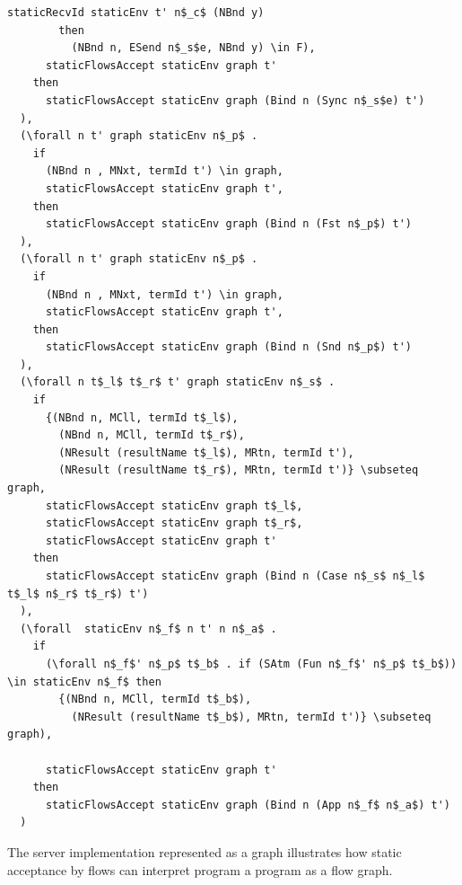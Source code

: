 \documentclass[10pt]{article}
\begin{document}
\begin{lstlisting}[language=logic, mathescape]
          staticRecvId staticEnv t' n$_c$ (NBnd y)
        then
          (NBnd n, ESend n$_s$e, NBnd y) \in F),
      staticFlowsAccept staticEnv graph t'
    then
      staticFlowsAccept staticEnv graph (Bind n (Sync n$_s$e) t')
  ),
  (\forall n t' graph staticEnv n$_p$ .
    if
      (NBnd n , MNxt, termId t') \in graph,
      staticFlowsAccept staticEnv graph t',
    then
      staticFlowsAccept staticEnv graph (Bind n (Fst n$_p$) t')
  ),
  (\forall n t' graph staticEnv n$_p$ .
    if
      (NBnd n , MNxt, termId t') \in graph,
      staticFlowsAccept staticEnv graph t',
    then
      staticFlowsAccept staticEnv graph (Bind n (Snd n$_p$) t')
  ),
  (\forall n t$_l$ t$_r$ t' graph staticEnv n$_s$ .
    if
      {(NBnd n, MCll, termId t$_l$),
        (NBnd n, MCll, termId t$_r$),
        (NResult (resultName t$_l$), MRtn, termId t'),
        (NResult (resultName t$_r$), MRtn, termId t')} \subseteq graph,
      staticFlowsAccept staticEnv graph t$_l$,
      staticFlowsAccept staticEnv graph t$_r$,
      staticFlowsAccept staticEnv graph t'
    then
      staticFlowsAccept staticEnv graph (Bind n (Case n$_s$ n$_l$ t$_l$ n$_r$ t$_r$) t')
  ),
  (\forall  staticEnv n$_f$ n t' n n$_a$ .
    if
      (\forall n$_f$' n$_p$ t$_b$ . if (SAtm (Fun n$_f$' n$_p$ t$_b$)) \in staticEnv n$_f$ then 
        {(NBnd n, MCll, termId t$_b$),
          (NResult (resultName t$_b$), MRtn, termId t')} \subseteq graph),

      staticFlowsAccept staticEnv graph t'
    then
      staticFlowsAccept staticEnv graph (Bind n (App n$_f$ n$_a$) t')
  )
\end{lstlisting}

\newpage

The server implementation represented as a graph illustrates how static acceptance by flows can interpret
program a program as a flow graph.
\end{document}
